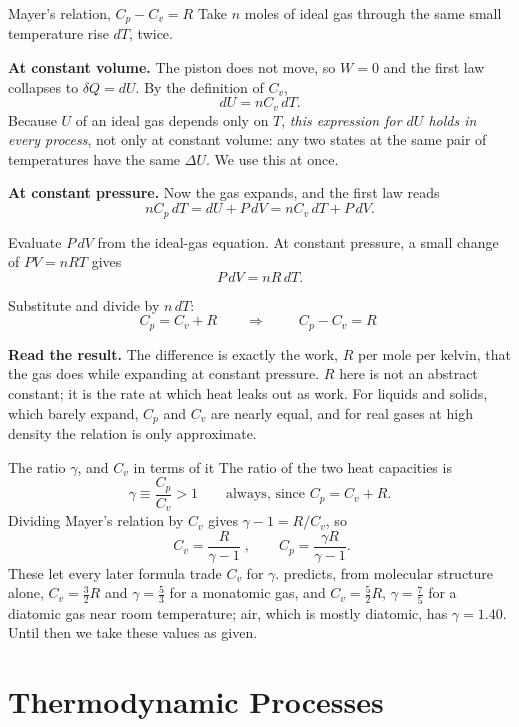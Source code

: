 \begin{derivbox}{Mayer's relation, \texorpdfstring{$C_p-C_v=R$}{Cp - Cv = R}}\label{der:mayer}
Take $n$ moles of ideal gas through the same small temperature rise $dT$, twice.

 \textbf{At constant volume.} The piston does not move, so $W=0$ and the first law collapses to
$\delta Q=dU$. By the definition of $C_v$,
\[ dU=nC_v\,dT . \]
Because $U$ of an ideal gas depends only on $T$, \emph{this expression for $dU$ holds in every process},
not only at constant volume: any two states at the same pair of temperatures have the same $\Delta U$. We
use this at once.

 \textbf{At constant pressure.} Now the gas expands, and the first law reads
\[ nC_p\,dT=dU+P\,dV=nC_v\,dT+P\,dV . \]

 Evaluate $P\,dV$ from the ideal-gas equation. At constant pressure, a small change of $PV=nRT$
gives
\[ P\,dV=nR\,dT . \]

 Substitute and divide by $n\,dT$:
\[ C_p=C_v+R \qquad\Longrightarrow\qquad \boxed{\;C_p-C_v=R\;} \]

 \textbf{Read the result.} The difference is exactly the work, $R$ per mole per kelvin, that the gas
does while expanding at constant pressure. $R$ here is not an abstract constant; it is the rate at which
heat leaks out as work. For liquids and solids, which barely expand, $C_p$ and $C_v$ are nearly equal,
and for real gases at high density the relation is only approximate.
\end{derivbox}

\begin{keybox}{The ratio \texorpdfstring{$\gamma$}{gamma}, and \texorpdfstring{$C_v$}{Cv} in terms of it}\label{key:gamma}
The ratio of the two heat capacities is
\[ \gamma\equiv\frac{C_p}{C_v}>1\qquad\text{always, since } C_p=C_v+R. \]
Dividing Mayer's relation by $C_v$ gives $\gamma-1=R/C_v$, so
\[
\boxed{\;C_v=\frac{R}{\gamma-1}\;},\qquad C_p=\frac{\gamma R}{\gamma-1}.
\]
These let every later formula trade $C_v$ for $\gamma$.  predicts, from molecular
structure alone, $C_v=\tfrac32R$ and $\gamma=\tfrac53$ for a monatomic gas, and $C_v=\tfrac52R$,
$\gamma=\tfrac75$ for a diatomic gas near room temperature; air, which is mostly diatomic, has
$\gamma=1.40$. Until then we take these values as given.
\end{keybox}

\section{Thermodynamic Processes}\label{sec:processes}

